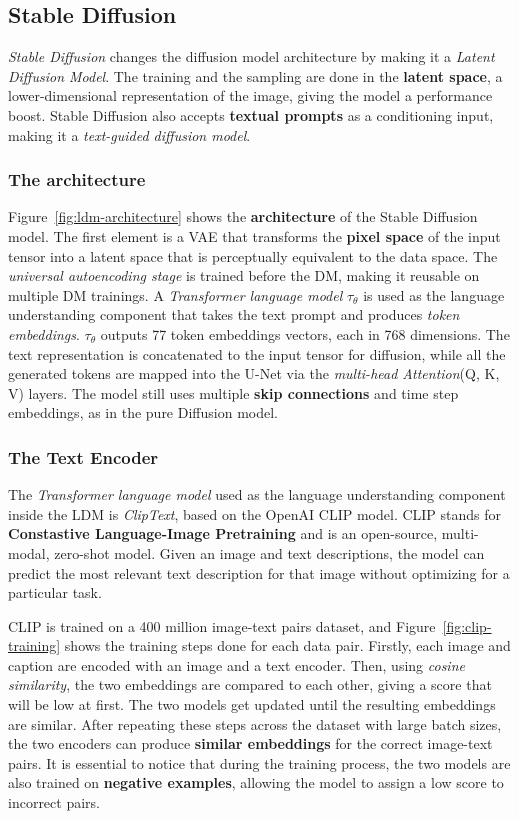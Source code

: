 \documentclass[preprint]{elsarticle}
\begin{document}
\subsection{Stable Diffusion}\label{sec:stable-diffusion}
\emph{Stable Diffusion} \cite{rombach2022highresolution} changes the diffusion model architecture by making 
it a \emph{Latent Diffusion Model}. 
The training and the sampling are done in the \textbf{latent space}, 
a lower-dimensional representation of the image, giving the model a performance boost.
Stable Diffusion also accepts \textbf{textual prompts} as a conditioning input, making it a \emph{text-guided diffusion model}.

\subsubsection{The architecture}\label{sec:ldm-architecture} 

Figure~\ref{fig:ldm-architecture} shows the \textbf{architecture} of the Stable Diffusion model.
The first element is a VAE that transforms the \textbf{pixel space} of the input tensor into a latent space that is 
perceptually equivalent to the data space. The \emph{universal autoencoding stage} is trained before the DM, 
making it reusable on multiple DM trainings. A \emph{Transformer language model} $\tau_\theta$ is used as the language understanding component 
that takes the text prompt and produces \emph{token embeddings}. $\tau_\theta$ outputs 77 token embeddings vectors, each in 768 dimensions. 
The text representation is concatenated to the input tensor for diffusion, while all the generated tokens are mapped into the 
U-Net via the \emph{multi-head Attention}(Q, K, V) layers. The model still uses multiple \textbf{skip connections} and time step embeddings,
as in the pure Diffusion model.

\subsubsection{The Text Encoder}
The \emph{Transformer language model} used as the language understanding component inside the LDM is \emph{ClipText}, based on the OpenAI CLIP model.
CLIP stands for \textbf{Constastive Language-Image Pretraining} and is an open-source, multi-modal, zero-shot model. 
Given an image and text descriptions, the model can predict the most relevant text description for that image without 
optimizing for a particular task.


CLIP is trained on a 400 million image-text pairs dataset, and Figure~\ref{fig:clip-training} shows the training steps done for each 
data pair.
Firstly, each image and caption are encoded with an image and a text encoder. Then, using \emph{cosine similarity}, 
the two embeddings are compared to each other, giving a score that will be low at first. 
The two models get updated until the resulting embeddings are similar. 
After repeating these steps across the dataset with large batch sizes, the two encoders can produce \textbf{similar embeddings} 
for the correct image-text pairs. It is essential to notice that during the training process, 
the two models are also trained on \textbf{negative examples}, allowing the model to assign a low score to incorrect pairs.
\end{document}
